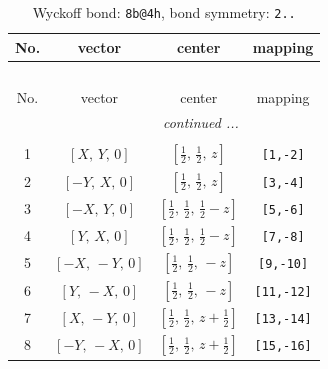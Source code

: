 \documentclass[fleqn,8pt]{jsarticle}
\begin{document}
\begin{longtable}{cccc}
\caption{Wyckoff bond: {\tt 8b@4h}, bond symmetry: {\tt 2..}}
 \\
 \hline \hline
No. & vector & center & mapping \\ \hline \endfirsthead

\multicolumn{3}{l}{\tablename\ \thetable{}} \\
 \hline \hline
No. & vector & center & mapping \\ \hline \endhead

 \hline \hline
\multicolumn{3}{r}{\footnotesize\it continued ...} \\ \endfoot

 \hline \hline
\multicolumn{3}{r}{} \\ \endlastfoot

1 & $\left[ X,\, Y,\, 0 \right]$ & $\left[ \frac{1}{2},\, \frac{1}{2},\, z \right]$ & {\tt [1,-2]} \\ \hline
2 & $\left[ - Y,\, X,\, 0 \right]$ & $\left[ \frac{1}{2},\, \frac{1}{2},\, z \right]$ & {\tt [3,-4]} \\ \hline
3 & $\left[ - X,\, Y,\, 0 \right]$ & $\left[ \frac{1}{2},\, \frac{1}{2},\, \frac{1}{2} - z \right]$ & {\tt [5,-6]} \\ \hline
4 & $\left[ Y,\, X,\, 0 \right]$ & $\left[ \frac{1}{2},\, \frac{1}{2},\, \frac{1}{2} - z \right]$ & {\tt [7,-8]} \\ \hline
5 & $\left[ - X,\, - Y,\, 0 \right]$ & $\left[ \frac{1}{2},\, \frac{1}{2},\, - z \right]$ & {\tt [9,-10]} \\ \hline
6 & $\left[ Y,\, - X,\, 0 \right]$ & $\left[ \frac{1}{2},\, \frac{1}{2},\, - z \right]$ & {\tt [11,-12]} \\ \hline
7 & $\left[ X,\, - Y,\, 0 \right]$ & $\left[ \frac{1}{2},\, \frac{1}{2},\, z + \frac{1}{2} \right]$ & {\tt [13,-14]} \\ \hline
8 & $\left[ - Y,\, - X,\, 0 \right]$ & $\left[ \frac{1}{2},\, \frac{1}{2},\, z + \frac{1}{2} \right]$ & {\tt [15,-16]} \\
\end{longtable}
\renewcommand{\arraystretch}{1.2}
\end{document}
